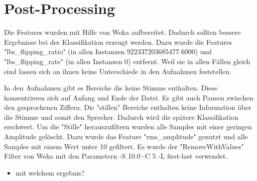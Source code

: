 \section{Post-Processing}
Die Features wurden mit Hilfe von Weka aufbereitet. Dadurch sollten bessere Ergebnisse bei der Klassifikation erzeugt werden. Dazu wurde die Features "lbs_flipping_ratio" (in allen Instanzen 922337203685477.6000) und "lbs_flipping_rate" (in allen Instanzen 0) entfernt. Weil sie in allen Fällen gleich sind lassen sich an ihnen keine Unterschiede in den Aufnahmen feststellen.

In den Aufnahmen gibt es Bereiche die keine Stimme enthalten. Diese konzentrieren sich auf Anfang und Ende der Datei. Es gibt auch Pausen zwischen den gesprochenen Ziffern. Die "stillen" Bereiche enthalten keine Information über die Stimme und somit den Sprecher. Dadurch wird die spätere Klassifikation erschwert. Um die "Stille" herauszufiltern wurden alle Samples mit einer geringen Amplitude gelöscht. Dazu wurde das Feature "rms_amplitude" genutzt und alle Samples mit einem Wert unter 10 gefiltert. Es wurde der "RemoveWithValues" Filter von Weka mit den Parametern -S 10.0 -C 5 -L first-last verwendet.

\begin{itemize}
    \item mit welchem ergebnis?
\end{itemize}

